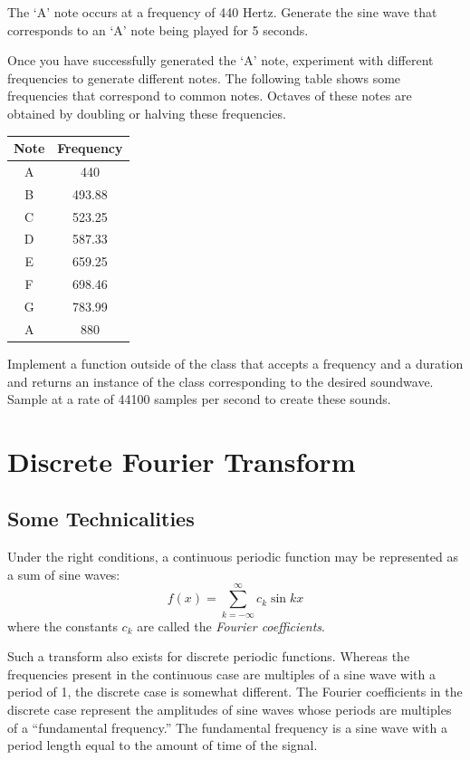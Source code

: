 \begin{problem}
The `A' note occurs at a frequency of 440 Hertz.
Generate the sine wave that corresponds to an `A' note being played for 5 seconds.

Once you have successfully generated the `A' note, experiment with different frequencies to generate different notes.
The following table shows some frequencies that correspond to common notes. Octaves of these notes are obtained by
doubling or halving these frequencies.

\begin{center}
\begin{tabular}{|c|c|}
\hline
Note & Frequency \\
\hline
A & 440 \\
B & 493.88 \\
C & 523.25 \\
D & 587.33 \\
E & 659.25 \\
F & 698.46 \\
G & 783.99 \\
A & 880 \\
\hline
\end{tabular}
\end{center}

Implement a function outside of the  class that accepts a frequency and a duration and returns an instance of the  class corresponding to the desired soundwave.
Sample at a rate of 44100 samples per second to create these sounds.
\end{problem}

\section*{Discrete Fourier Transform} %

\subsection*{Some Technicalities} %

Under the right conditions, a continuous periodic function may be represented as a sum of sine waves:
\[
f(x) = \displaystyle{\sum_{k=-\infty}^{\infty}} c_k \sin{kx}
\]
where the constants $c_k$ are called the \emph{Fourier coefficients}.

Such a transform also exists for discrete periodic functions.
Whereas the frequencies present in the continuous case are multiples of a sine wave with a period of 1, the discrete case is somewhat different.
The Fourier coefficients in the discrete case represent the amplitudes of sine waves whose periods are multiples of a ``fundamental frequency.''
The fundamental frequency is a sine wave with a period length equal to the amount of time of the signal.

